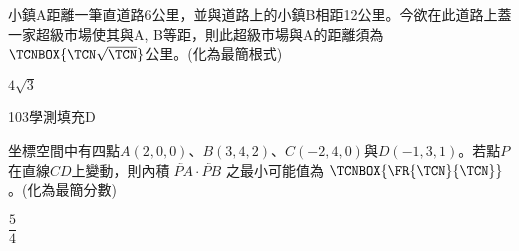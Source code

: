 \begin{QUESTIONS}
\begin{QUESTION}
\begin{ExamAnsRateInfo}{49}{87}{53}{7}
        \end{ExamAnsRateInfo}
        \begin{QBODY}
            小鎮A距離一筆直道路6公里，並與道路上的小鎮B相距12公里。今欲在此道路上蓋一家超級市場使其與A, B等距，則此超級市場與A的距離須為$\TCNBOX{\TCN\sqrt{\TCN}}$公里。(化為最簡根式)
        \end{QBODY}
        \begin{QFROMS}
        \end{QFROMS}
        \begin{QTAGS}\end{QTAGS}
        \begin{QANS}
            $4\sqrt{3}$
        \end{QANS}
        \begin{QSOLLIST}
        \end{QSOLLIST}
        \begin{QEMPTYSPACE}
        \end{QEMPTYSPACE}
    \end{QUESTION}
    \begin{QUESTION}
        \begin{ExamInfo}{103}{學測}{填充}{D}
        \end{ExamInfo}
        \begin{ExamAnsRateInfo}{31}{76}{16}{1}
        \end{ExamAnsRateInfo}
        \begin{QBODY}
            坐標空間中有四點$A(2,0,0)$、$B(3,4,2)$、$C(-2,4,0)$與$D(-1,3,1)$。若點$P$在直線$CD$上變動，則內積$\lvec{PA}\cdot \lvec{PB}$ 之最小可能值為 $\TCNBOX{\FR{\TCN}{\TCN}}$。(化為最簡分數)
        \end{QBODY}
        \begin{QFROMS}
        \end{QFROMS}
        \begin{QTAGS}\end{QTAGS}
        \begin{QANS}
            $\dfrac{5}{4}$
        \end{QANS}
        \begin{QSOLLIST}
        \end{QSOLLIST}
        \begin{QEMPTYSPACE}
        \end{QEMPTYSPACE}
    \end{QUESTION}
    \begin{QUESTION}

\end{QUESTION}
\end{QUESTIONS}
